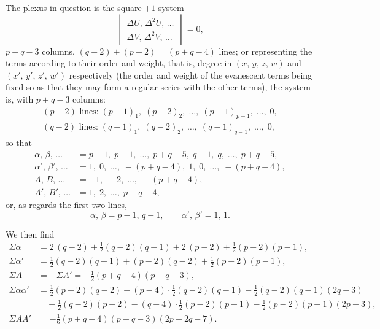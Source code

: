 \documentclass[11pt,a4paper]{article}
\begin{document}
\medskip

The plexus in question is the square $+1$ system
\[
\begin{vmatrix}
\Delta U,\,\Delta^2 U,\,\ldots\\
\Delta V,\,\Delta^2 V,\,\ldots
\end{vmatrix} = 0,
\]
$p + q - 3$ columns, $(q-2) + (p-2) = (p+q-4)$ lines; or representing the terms according to their order and weight, that is, degree in $(x,\,y,\,z,\,w)$ and $(x',\,y',\,z',\,w')$ respectively (the order and weight of the evanescent terms being fixed so as that they may form a regular series with the other terms), the system is, with $p+q-3$ columns:
\[
\begin{array}{l}
\text{$(p-2)$ lines:}\;(p-1)_1,\;(p-2)_2,\;\ldots,\;(p-1)_{p-1}, \;\ldots,\;0,\\[2pt]
\text{$(q-2)$ lines:}\;(q-1)_1,\;(q-2)_2,\;\ldots,\;(q-1)_{q-1},\;\ldots,\;0,
\end{array}
\]
so that
\begin{align*}
\alpha,\,\beta,\,\ldots &= p-1,\;p-1,\;\ldots,\;p+q-5,\;q-1,\;q,\;\ldots,\;p+q-5,\\
\alpha',\,\beta',\,\ldots &= 1,\;0,\;\ldots,\;-(p+q-4),\;1,\;0,\;\ldots,\;-(p+q-4),\\
A,\,B,\,\ldots &= -1,\;-2,\;\ldots,\;-(p+q-4),\\
A',\,B',\,\ldots &= 1,\;2,\;\ldots,\;p+q-4,
\end{align*}
or, as regards the first two lines,
\[
\alpha,\,\beta = p-1,\,q-1,\qquad\alpha',\,\beta' = 1,\,1.
\]

We then find
\begin{align*}
\Sigma\alpha  &= 2\,(q-2) + \tfrac{1}{2}(q-2)(q-1) + 2\,(p-2) + \tfrac{1}{2}(p-2)(p-1),\\
\Sigma\alpha' &= \tfrac{1}{2}(q-2)(q-1) + (p-2)(q-2) + \tfrac{1}{2}(p-2)(p-1),\\
\Sigma A      &= -\Sigma A' = -\tfrac{1}{2}(p+q-4)(p+q-3),\\
\Sigma\alpha\alpha' &= \tfrac{1}{2}(p-2)(q-2) - (p-4)\cdot\tfrac{1}{2}(q-2)(q-1) - \tfrac{1}{2}(q-2)(q-1)(2q-3)\\
&\quad + \tfrac{1}{2}(q-2)(p-2) - (q-4)\cdot\tfrac{1}{2}(p-2)(p-1) - \tfrac{1}{2}(p-2)(p-1)(2p-3),\\
\Sigma A A'   &= -\tfrac{1}{6}(p+q-4)(p+q-3)(2p+2q-7).
\end{align*}
\end{document}
